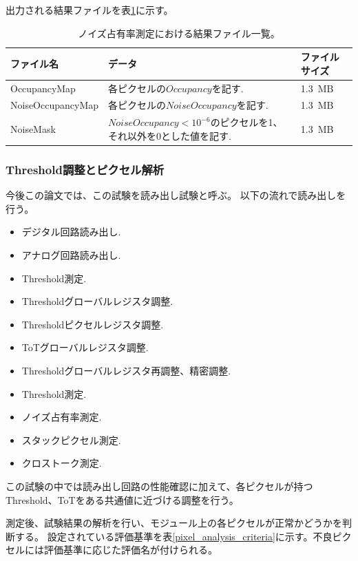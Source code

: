 出力される結果ファイルを表\ref{noise_result_files}に示す。

\begin{table}[tbp]
\begin{center}
\caption[ノイズ占有率測定における結果ファイル一覧]{ノイズ占有率測定における結果ファイル一覧。}
\label{noise_result_files}
  \small
  \begin{tabular}{|lll|} \hline
    ファイル名 & データ & ファイルサイズ \\ \hline
    OccupancyMap      & 各ピクセルの$Occupancy$を記す. & 1.3~MB \\ 
    NoiseOccupancyMap & 各ピクセルの$NoiseOccupancy$を記す. & 1.3~MB \\ 
    NoiseMask         & $NoiseOccupancy < 10^{-6}$のピクセルを1、それ以外を0とした値を記す. & 1.3~MB \\ \hline 
  \end{tabular}
\end{center}
\end{table}

\clearpage
\subsubsection{Threshold調整とピクセル解析}\label{sec:pixel_analysis}
今後この論文では、この試験を読み出し試験と呼ぶ。
以下の流れで読み出しを行う。
\begin{itemize}
  \item デジタル回路読み出し.
  \item アナログ回路読み出し.
  \item Threshold測定.
  \item Thresholdグローバルレジスタ調整.
  \item Thresholdピクセルレジスタ調整.
  \item ToTグローバルレジスタ調整.
  \item Thresholdグローバルレジスタ再調整、精密調整.
  \item Threshold測定.
  \item ノイズ占有率測定.
  \item スタックピクセル測定.
  \item クロストーク測定.
\end{itemize}
この試験の中では読み出し回路の性能確認に加えて、各ピクセルが持つThreshold、ToTをある共通値に近づける調整を行う。

測定後、試験結果の解析を行い、モジュール上の各ピクセルが正常かどうかを判断する。
設定されている評価基準を表\ref{pixel_analysis_criteria}に示す。不良ピクセルには評価基準に応じた評価名が付けられる。

